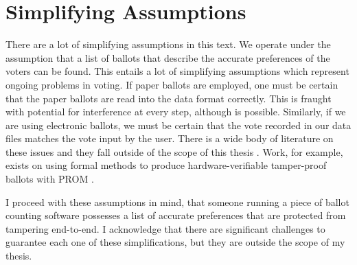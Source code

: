 \section{Simplifying Assumptions}

There are a lot of simplifying assumptions in this text. We operate under the
assumption that a list of ballots that describe the accurate preferences of the
voters can be found. This entails a lot of simplifying assumptions which
represent ongoing problems in voting. If paper ballots are employed, one must be
certain that the paper ballots are read into the data format correctly. This is
fraught with potential for interference at every step, although is possible.
Similarly, if we are using electronic ballots, we must be certain that the vote
recorded in our data files matches the vote input by the user. There is a wide
body of literature on these issues and they fall outside of the scope of this
thesis \cite{election_safety}. Work, for example, exists on using formal methods
to produce hardware-verifiable tamper-proof ballots with PROM
\cite{prom1,prom2}. 

I proceed with these assumptions in mind, that someone running a piece of ballot
counting software possesses a list of accurate preferences that are protected from
tampering end-to-end. I acknowledge that there are significant challenges to
guarantee each one of these simplifications, but they are outside the scope of
my thesis. 